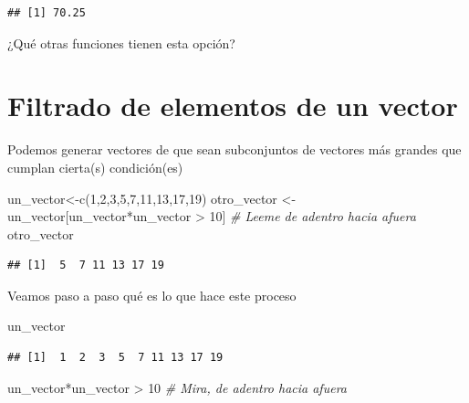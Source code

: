 \documentclass[
]{book}
\newenvironment{Shaded}{\begin{snugshade}}{\end{snugshade}}
\newcommand{\CommentTok}[1]{\textcolor[rgb]{0.56,0.35,0.01}{\textit{#1}}}
\newcommand{\DecValTok}[1]{\textcolor[rgb]{0.00,0.00,0.81}{#1}}
\newcommand{\FunctionTok}[1]{\textcolor[rgb]{0.00,0.00,0.00}{#1}}
\newcommand{\NormalTok}[1]{#1}
\newcommand{\OtherTok}[1]{\textcolor[rgb]{0.56,0.35,0.01}{#1}}
\newcommand{\SpecialCharTok}[1]{\textcolor[rgb]{0.00,0.00,0.00}{#1}}
\begin{document}
\begin{verbatim}
## [1] 70.25
\end{verbatim}

¿Qué otras funciones tienen esta opción?

\hypertarget{filtrado-de-elementos-de-un-vector}{%
\section{Filtrado de elementos de un vector}\label{filtrado-de-elementos-de-un-vector}}

Podemos generar vectores de que sean subconjuntos de vectores más grandes que cumplan cierta(s) condición(es)

\begin{Shaded}
\begin{Highlighting}[]
\NormalTok{un\_vector}\OtherTok{\textless{}{-}}\FunctionTok{c}\NormalTok{(}\DecValTok{1}\NormalTok{,}\DecValTok{2}\NormalTok{,}\DecValTok{3}\NormalTok{,}\DecValTok{5}\NormalTok{,}\DecValTok{7}\NormalTok{,}\DecValTok{11}\NormalTok{,}\DecValTok{13}\NormalTok{,}\DecValTok{17}\NormalTok{,}\DecValTok{19}\NormalTok{) }
\NormalTok{otro\_vector }\OtherTok{\textless{}{-}}\NormalTok{ un\_vector[un\_vector}\SpecialCharTok{*}\NormalTok{un\_vector }\SpecialCharTok{\textgreater{}} \DecValTok{10}\NormalTok{]   }\CommentTok{\# Leeme de adentro hacia afuera}
\NormalTok{otro\_vector}
\end{Highlighting}
\end{Shaded}

\begin{verbatim}
## [1]  5  7 11 13 17 19
\end{verbatim}

Veamos paso a paso qué es lo que hace este proceso

\begin{Shaded}
\begin{Highlighting}[]
\NormalTok{un\_vector}
\end{Highlighting}
\end{Shaded}

\begin{verbatim}
## [1]  1  2  3  5  7 11 13 17 19
\end{verbatim}

\begin{Shaded}
\begin{Highlighting}[]
\NormalTok{un\_vector}\SpecialCharTok{*}\NormalTok{un\_vector }\SpecialCharTok{\textgreater{}} \DecValTok{10}    \CommentTok{\# Mira, de adentro hacia afuera}
\end{Highlighting}
\end{Shaded}
\end{document}
